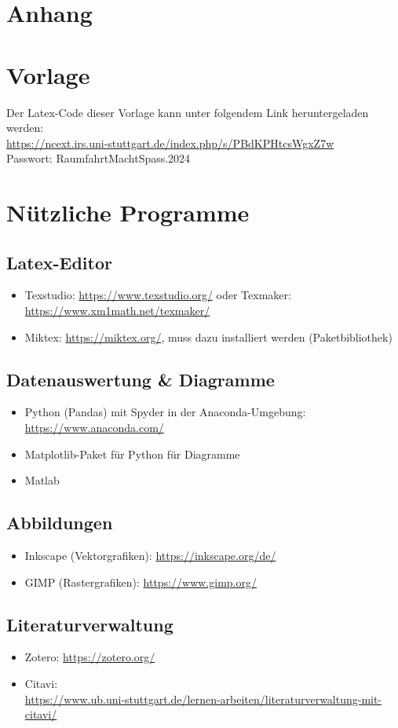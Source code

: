 \newpage
\chapter*{Anhang}

\chapter{Vorlage}
Der Latex-Code dieser Vorlage kann unter folgendem Link heruntergeladen werden:\\
\url{https://ncext.irs.uni-stuttgart.de/index.php/s/PBdKPHtcsWgxZ7w}\\
Passwort: RaumfahrtMachtSpass.2024

\chapter{Nützliche Programme}

\section{Latex-Editor}
\label{sec:latex_editor}
\begin{itemize}
	\item Texstudio: \url{https://www.texstudio.org/} oder Texmaker: \url{https://www.xm1math.net/texmaker/} 
	\item Miktex: \url{https://miktex.org/}, muss dazu installiert werden (Paketbibliothek)
\end{itemize}
\section{Datenauswertung \& Diagramme}
\label{sec:datenauswertung_diagramme}
\begin{itemize}
	\item Python (Pandas) mit Spyder in der Anaconda-Umgebung: \url{https://www.anaconda.com/}
	\item Matplotlib-Paket für Python für Diagramme
	\item Matlab 
\end{itemize}
\section{Abbildungen}
\label{sec:abbildungen}
\begin{itemize}
	\item Inkscape (Vektorgrafiken): \url{https://inkscape.org/de/}
	\item GIMP (Rastergrafiken): \url{https://www.gimp.org/}
\end{itemize}
\section{Literaturverwaltung}
\label{sec:literaturverwaltung}
\begin{itemize}
	\item Zotero: \url{https://zotero.org/}
	\item Citavi: \\ \url{https://www.ub.uni-stuttgart.de/lernen-arbeiten/literaturverwaltung-mit-citavi/}
\end{itemize}